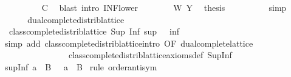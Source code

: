 \begin{isabellebody}
\ \ \ \ \ \ \ \ \isamarkupfalse%
\ C\ \isamarkupfalse%
\ {\isacharparenleft}{\kern0pt}blast\ intro{\isacharcolon}{\kern0pt}\ INF{\isacharunderscore}{\kern0pt}lower{\isacharparenright}{\kern0pt}\isanewline
\ \ \ \ \ \ \isamarkupfalse%
\ W\ Y\ \isamarkupfalse%
\ {\isacharquery}{\kern0pt}thesis\isanewline
\ \ \ \ \ \ \ \ \isamarkupfalse%
\ simp\isanewline
\ \ \ \ \isamarkupfalse%
\isanewline
\ \ \isamarkupfalse%
\isanewline
{}\isamarkupfalse%
%
\endisatagproof
{\isafoldproof}%
%
\isadelimproof
\isanewline
%
\endisadelimproof
\ \ \isanewline
{}\isamarkupfalse%
\ dual{\isacharunderscore}{\kern0pt}complete{\isacharunderscore}{\kern0pt}distrib{\isacharunderscore}{\kern0pt}lattice{\isacharcolon}{\kern0pt}\isanewline
\ \ {\isachardoublequoteopen}class{\isachardot}{\kern0pt}complete{\isacharunderscore}{\kern0pt}distrib{\isacharunderscore}{\kern0pt}lattice\ Sup\ Inf\ sup\ {\isacharparenleft}{\kern0pt}{\isasymge}{\isacharparenright}{\kern0pt}\ {\isacharparenleft}{\kern0pt}{\isachargreater}{\kern0pt}{\isacharparenright}{\kern0pt}\ inf\ {\isasymtop}\ {\isasymbottom}{\isachardoublequoteclose}\isanewline
%
\isadelimproof
\ \ %
\endisadelimproof
%
\isatagproof
{}\isamarkupfalse%
\ {\isacharparenleft}{\kern0pt}simp\ add{\isacharcolon}{\kern0pt}\ class{\isachardot}{\kern0pt}complete{\isacharunderscore}{\kern0pt}distrib{\isacharunderscore}{\kern0pt}lattice{\isachardot}{\kern0pt}intro\ {\isacharbrackleft}{\kern0pt}OF\ dual{\isacharunderscore}{\kern0pt}complete{\isacharunderscore}{\kern0pt}lattice{\isacharbrackright}{\kern0pt}\ \isanewline
\ \ \ \ \ \ \ \ \ \ \ \ \ \ \ \ class{\isachardot}{\kern0pt}complete{\isacharunderscore}{\kern0pt}distrib{\isacharunderscore}{\kern0pt}lattice{\isacharunderscore}{\kern0pt}axioms{\isacharunderscore}{\kern0pt}def\ Sup{\isacharunderscore}{\kern0pt}Inf{\isacharparenright}{\kern0pt}%
\endisatagproof
{\isafoldproof}%
%
\isadelimproof
\isanewline
%
\endisadelimproof
\isanewline
{}\isamarkupfalse%
\ sup{\isacharunderscore}{\kern0pt}Inf{\isacharcolon}{\kern0pt}\ {\isachardoublequoteopen}a\ {\isasymsqunion}\ {\isasymSqinter}B\ {\isacharequal}{\kern0pt}\ {\isasymSqinter}{\isacharparenleft}{\kern0pt}{\isacharparenleft}{\kern0pt}{\isasymsqunion}{\isacharparenright}{\kern0pt}\ a\ {\isacharbackquote}{\kern0pt}\ B{\isacharparenright}{\kern0pt}{\isachardoublequoteclose}\isanewline
%
\isadelimproof
%
\endisadelimproof
%
\isatagproof
{}\isamarkupfalse%
\ {\isacharparenleft}{\kern0pt}rule\ order{\isachardot}{\kern0pt}antisym{\isacharparenright}{\kern0pt}\isanewline

\end{isabellebody}
